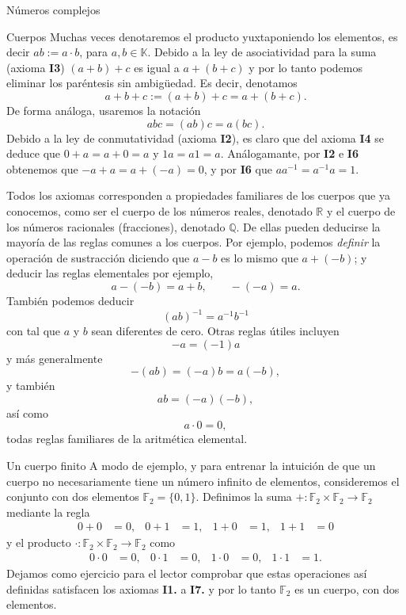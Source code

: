\documentclass[a4paper,12pt,twoside,spanish]{amsbook}
\theoremstyle{definition}
\theoremstyle{remark}
\newcommand{\Q}{\mathbb Q}
\newcommand{\R}{\mathbb R}
\newcommand{\K}{\mathbb K}
\newcommand{\F}{\mathbb F}
\begin{document}
\begin{chapter}{Números complejos}
\begin{section}{Cuerpos}
		Muchas veces denotaremos el producto yuxtaponiendo los elementos,  es decir $ab := a\cdot b$, para $a,b \in \K$. Debido a la ley de asociatividad para la suma (axioma {\bf I3}) $(a+b)+c$ es igual a $a+(b+c)$ y por lo tanto podemos eliminar los paréntesis sin ambigüedad. Es decir, denotamos
		$$
		a+b+c := (a+b)+c = a+(b+c).
		$$
		De forma análoga, usaremos la notación
		$$
		abc = (ab)c = a(bc).
		$$
		Debido a la ley de conmutatividad (axioma {\bf I2}), es claro que del axioma {\bf I4} se deduce que  $0+a=a+0=a$ y $1a = a1=a$. Análogamante,  por  {\bf I2} e  {\bf I6} obtenemos que  $-a+a =   
		a+(-a)=0$, y por {\bf I6} que  $a a^{-1} = a^{-1}a=1$.
		
		
		
		Todos los axiomas corresponden a propiedades familiares de los cuerpos que ya conocemos,  como ser el cuerpo de los números reales, denotado $\R$ y el cuerpo de los números racionales (fracciones),  denotado $\Q$. De ellas pueden deducirse la mayoría de las reglas comunes a los cuerpos. Por ejemplo, podemos {\it definir} la operación de sustracción diciendo que $a-b$ es lo mismo que $a+(-b)$; y deducir las reglas elementales por ejemplo,
		\begin{equation*}
		a-(-b) = a+b, \qquad -(-a) = a.
		\end{equation*}	
		También podemos deducir
		\begin{equation*}
		(ab)^{-1} = a^{-1}b^{-1}
		\end{equation*}
		con tal que $a$ y $b$ sean diferentes de cero. Otras reglas útiles incluyen	
		\begin{equation*}
		-a = (-1)a 
		\end{equation*}					
		y más generalmente
		\begin{equation*}
		- (ab) = (-a) b = a  (-b),
		\end{equation*}	
		y  también 
		\begin{equation*}
		ab = (-a) (-b),
		\end{equation*}
		así como
		\begin{equation*}
		a\cdot 0 = 0,
		\end{equation*}
		todas reglas familiares de la aritmética elemental.
	\end{section}
	
	
	\begin{subsection}{Un cuerpo finito}
		A modo de ejemplo, y para entrenar la intuición de que un cuerpo no necesariamente tiene un número infinito de elementos, consideremos el conjunto con dos elementos $\F_2=\{0,1\}$. Definimos la suma $+\colon\F_2\times \F_2\to \F_2$ mediante la regla
		\begin{align*}
		0+0&=0, & 0+1&=1, & 1+0&=1, & 1+1&=0
		\end{align*}
		y el producto $\cdot \colon\F_2\times \F_2\to \F_2$ como 
		\begin{align*}
		0\cdot 0&=0, & 0\cdot 1&=0, & 1\cdot 0&=0, & 1\cdot 1&=1.
		\end{align*}
		Dejamos como ejercicio para el lector comprobar que estas operaciones así definidas satisfacen los axiomas {\bf I1.} a {\bf I7.} y por lo tanto $\F_2$ es un cuerpo, con dos elementos.
		

\end{subsection}
\end{chapter}
\end{document}

